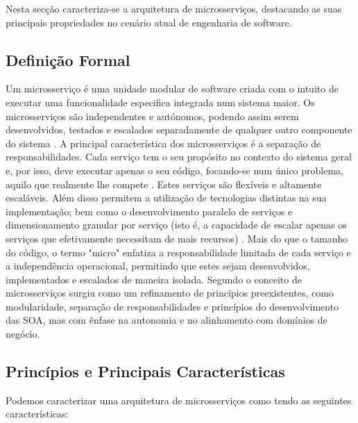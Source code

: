 Nesta secção caracteriza-se a arquitetura de microsserviços, destacando as suas principais propriedades no cenário atual de engenharia de software.

\subsection{Definição Formal}

Um microsserviço é uma unidade modular de software criada com o intuito de executar uma funcionalidade especifica integrada num sistema maior. Os microsserviços são independentes e autónomos, podendo assim serem desenvolvidos, testados e escalados separadamente de qualquer outro componente do sistema \cite{Jamshidi2018}. A principal característica dos microsserviços é a separação de responsabilidades. Cada serviço tem o seu propósito no contexto do sistema geral e, por isso, deve executar apenas o seu código, focando-se num único problema, aquilo que realmente lhe compete \cite{Newman2015}. Estes serviços são flexíveis e altamente escaláveis. Além disso permitem a utilização de tecnologias distintas na sua implementação; bem como o desenvolvimento paralelo de serviços e dimensionamento granular por serviço (isto é, a capacidade de escalar apenas os serviços que efetivamente necessitam de mais recursos) \cite{Lewis2014}. Mais do que o tamanho do código, o termo "micro" enfatiza a responsabilidade limitada de cada serviço e a independência operacional, permitindo que estes sejam desenvolvidos, implementados e escalados de maneira isolada. Segundo \cite{Dragoni2017} o conceito de microsserviços surgiu como um refinamento de princípios preexistentes, como modularidade, separação de responsabilidades e princípios do desenvolvimento das SOA, mas com ênfase na autonomia e no alinhamento com domínios de negócio.


\subsection{Princípios e Principais Características}

Podemos caracterizar uma arquitetura de microsserviços como tendo as seguintes características:

